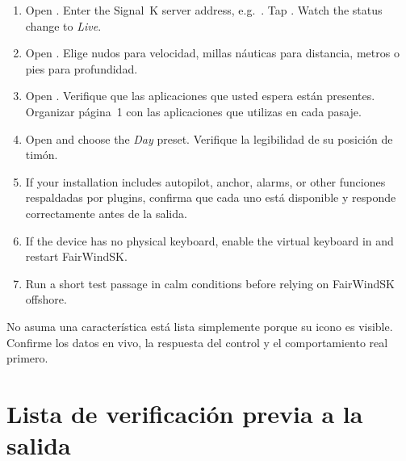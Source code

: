 \begin{enumerate}
  \item Open .
        Enter the Signal~K server address, e.g.\ .
        Tap .
        Watch the status change to \textit{Live}.
  \item Open .
Elige nudos para velocidad, millas náuticas para distancia, metros o pies para profundidad.
  \item Open .
Verifique que las aplicaciones que usted espera están presentes.
Organizar página~1 con las aplicaciones que utilizas en cada pasaje.
  \item Open  and choose the \textit{Day} preset.
Verifique la legibilidad de su posición de timón.
  \item If your installation includes autopilot, anchor, alarms, or other
funciones respaldadas por plugins, confirma que cada uno está disponible y responde correctamente
antes de la salida.
  \item If the device has no physical keyboard, enable the virtual keyboard in
         and restart FairWindSK.
  \item Run a short test passage in calm conditions before relying on FairWindSK
offshore.
\end{enumerate}

\begin{warningbox}
No asuma una característica está lista simplemente porque su icono es visible.
Confirme los datos en vivo, la respuesta del control y el comportamiento real primero.
\end{warningbox}

\section{Lista de verificación previa a la salida}

